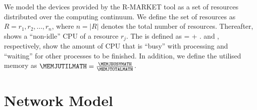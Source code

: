         We model the devices provided by the R-MARKET tool as a set of resources distributed over the computing continuum. 
        We define the set of resources as $R = {r_1, r_2, \dots, r_n}$, where $n = | R |$ denotes the total number of resources. 
        Thereafter, \CPUJUTIL shows a “non-idle” CPU of a resource $r_j$. 
        The \CPUJUTIL  is defined as \CPUJUTIL  = \CPUJBUSY  + \CPUJWAIT. \CPUJBUSY  and  \CPUJWAIT, respectively, show the amount of CPU that is “busy” with processing and “waiting” for other processes to be finished. In addition, we define the utilised memory as $\MEMJUTILMATH = \frac{\MEMJBUSYMATH}{\MEMJTOTALMATH}$.







    \section{Network Model}
    \label{sec:network-model}

